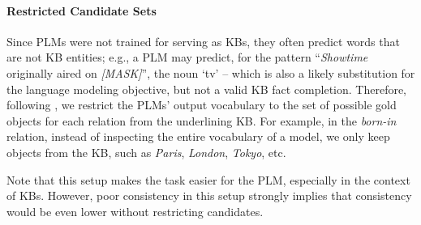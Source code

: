 \paragraph{Restricted Candidate Sets}

Since PLMs were not trained for serving as KBs, they often predict words that are not KB entities; e.g., a PLM may predict, for the pattern ``\textit{Showtime} originally aired on \textit{[MASK]}'', the noun `tv' --  which is also a likely substitution for the language modeling objective, but not a valid KB fact completion.
Therefore, following \citep{Xiong2020Pretrained, kassner2021multilingual}, we restrict the PLMs' output vocabulary to the set of possible gold objects for each relation from the underlining KB. For example, in the \textit{born-in} relation, instead of inspecting the entire vocabulary of a model, we only keep objects from the KB, such as \textit{Paris}, \textit{London}, \textit{Tokyo}, etc.


Note that this setup makes the task easier for the PLM,
especially in the context of KBs. However, poor
consistency in this setup strongly implies that consistency
would be even lower without restricting candidates.
